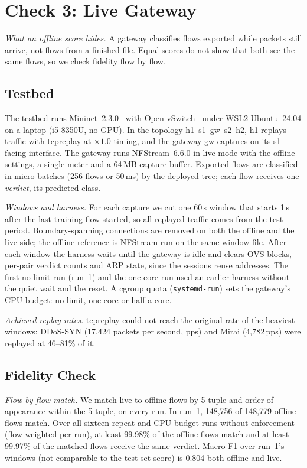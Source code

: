 \section{Check 3: Live Gateway}\label{sec:live}

\emph{What an offline score hides.} A gateway classifies flows exported while packets still arrive, not flows from a finished file. Equal scores do not show that both see the same flows, so we check fidelity flow by flow.

\subsection{Testbed}\label{sec:testbed}

The testbed runs Mininet~2.3.0~\cite{lantz2010mininet} with Open vSwitch~\cite{pfaff2015ovs} under WSL2 Ubuntu~24.04 on a laptop (i5-8350U, no GPU). In the topology h1--s1--gw--s2--h2, h1 replays traffic with tcpreplay at $\times1.0$ timing, and the gateway gw captures on its s1-facing interface. The gateway runs NFStream~6.6.0 in live mode with the offline settings, a single meter and a 64\,MB capture buffer. Exported flows are classified in micro-batches (256 flows or 50\,ms) by the deployed tree; each flow receives one \emph{verdict}, its predicted class.

\emph{Windows and harness.} For each capture we cut one 60\,s window that starts 1\,s after the last training flow started, so all replayed traffic comes from the test period. Boundary-spanning connections are removed on both the offline and the live side; the offline reference is NFStream run on the same window file. After each window the harness waits until the gateway is idle and clears OVS blocks, per-pair verdict counts and ARP state, since the sessions reuse addresses. The first no-limit run (run~1) and the one-core run used an earlier harness without the quiet wait and the reset. A cgroup quota (\texttt{systemd-run}) sets the gateway's CPU budget: no limit, one core or half a core.

\emph{Achieved replay rates.} tcpreplay could not reach the original rate of the heaviest windows: DDoS-SYN (17,424 packets per second, pps) and Mirai (4,782\,pps) were replayed at 46--81\% of it.

\subsection{Fidelity Check}\label{sec:fidelity}

\emph{Flow-by-flow match.} We match live to offline flows by 5-tuple and order of appearance within the 5-tuple, on every run. In run~1, 148,756 of 148,779 offline flows match. Over all sixteen repeat and CPU-budget runs without enforcement (flow-weighted per run), at least 99.98\% of the offline flows match and at least 99.97\% of the matched flows receive the same verdict. Macro-F1 over run~1's windows (not comparable to the test-set score) is 0.804 both offline and live.

